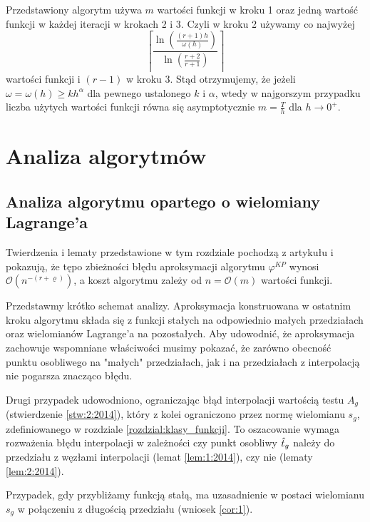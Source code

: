 \documentclass[oik, pdftex, man]{mgrwms}
\begin{document}
    Przedstawiony algorytm używa $m$ wartości funkcji w kroku 1 oraz jedną wartość funkcji w każdej iteracji w krokach 2 i 3. Czyli w kroku 2 używamy co najwyżej
    \begin{equation*}
        \left\lceil\frac{\ln \left(\frac{(r+1) h}{\omega(h)}\right)}{\ln \left(\frac{r+2}{r+1}\right)}\right\rceil
    \end{equation*}
    wartości funkcji i $(r-1)$ w kroku 3.
    Stąd otrzymujemy, że jeżeli $\omega = \omega(h) \geq kh^{\alpha}$ dla pewnego ustalonego $k$ i $\alpha$, wtedy w najgorszym przypadku liczba użytych wartości funkcji równa się asymptotycznie $m = \frac{T}{h}$ dla $h \rightarrow 0^{+}$.


\mgrclosechapter


\chapter{Analiza algorytmów} \label{rozdzial:analiza_alg}


\section{Analiza algorytmu opartego o wielomiany Lagrange'a}

    Twierdzenia i lematy przedstawione w tym rozdziale pochodzą z artykułu \cite{CoDF} i pokazują, że tępo zbieżności błędu aproksymacji algorytmu $\varphi^{KP}$ wynosi $\mathcal{O}(n^{-(r+\varrho)})$, a koszt algorytmu zależy od $n = \mathcal{O}(m)$ wartości funkcji.

    Przedstawmy krótko schemat analizy. Aproksymacja konstruowana w ostatnim kroku algorytmu składa się z funkcji stałych na odpowiednio małych przedziałach oraz wielomianów Lagrange'a na pozostałych. Aby udowodnić, że aproksymacja zachowuje wspomniane właściwości musimy pokazać, że zarówno obecność punktu osobliwego na "małych" przedziałach, jak i na przedziałach z interpolacją nie pogarsza znacząco błędu.

    Drugi przypadek udowodniono, ograniczając błąd interpolacji wartością testu $A_{g}$ (stwierdzenie \ref{stw:2:2014}), który z kolei ograniczono przez normę wielomianu $s_{g}$, zdefiniowanego w rozdziale \ref{rozdzial:klasy_funkcji}. To oszacowanie wymaga rozważenia błędu interpolacji w zależności czy punkt osobliwy $\hat{t}_{g}$ należy do przedziału z węzłami interpolacji (lemat \ref{lem:1:2014}), czy nie (lematy \ref{lem:2:2014}).
    
    Przypadek, gdy przybliżamy funkcją stałą, ma uzasadnienie w postaci wielomianu $s_{g}$ w połączeniu z długością przedziału (wniosek \ref{cor:1}).
\end{document}
